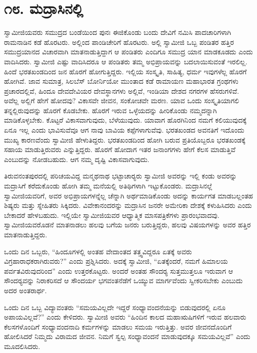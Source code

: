 
\chapter*{೧೮. ಮದ್ರಾಸಿನಲ್ಲಿ}

ಸ್ವಾಮೀಜಿಯವರು ಸಮುದ್ರದ ಬಂಡೆಯಿಂದ ಪುನಃ ಈಜಿಕೊಂಡು ಬಂದು ದೇವಿಗೆ ನಮಿಸಿ ಪಾದಚಾರಿಗಳಾಗಿ ರಾಮನಾಡಿನ ಕಡೆ ಹೊರಟರು. ಅಲ್ಲಿಂದ ಪಾಂಡಿಚೇರಿಗೆ ಹೊರಟರು. ಅಲ್ಲಿ ಸ್ವಾಮೀಜಿ ಒಬ್ಬ ಪಂಡಿತರ ಹತ್ತಿರ ಸಮುದ್ರಯಾನದ ವಿಚಾರವಾಗಿ ಮಾತನಾಡುತ್ತಿದ್ದಾಗ ಆ ಪಂಡಿತರು ಎಂದಿಗೂ ಸಮುದ್ರ ಯಾನ ಮಾಡಕೂಡದು ಎಂದು ವಾದಿಸಿದರು. ಸ್ವಾಮೀಜಿ ಎಷ್ಟು ವಾದಿಸಿದರೂ ಆ ಪಂಡಿತರು ತಮ್ಮ ಅಭಿಪ್ರಾಯವನ್ನು ಬದಲಾಯಿಸುವಂತೆ ಇರಲಿಲ್ಲ. ಹಿಂದೆ ಭರತಖಂಡದಿಂದ ಜನ ಹೊರಗೆ ಹೋಗುತ್ತಿದ್ದರು. ಇಲ್ಲಿಯ ಸಂಸ್ಕೃತಿ, ಸಾಹಿತ್ಯ, ಧರ್ಮ ಇವುಗಳೆಲ್ಲ ಹೊರಗೆ ಹೋಗಿವೆ. ಜಾವ ಸುಮಾತ್ರ, ಸಿಲಬೆಸ್ ಬೋರ್ನಿಯೋ ಮುಂತಾದ ಕಡೆ ರಾಮಾಯಣ ಮಹಾಭಾರತ ಗ್ರಂಥಗಳು ಪ್ರಚಾರದಲ್ಲಿವೆ, ಹಿಂದೂ ದೇವದೇವಿಯರ ದೇವಸ್ಥಾನಗಳು ಅಲ್ಲಿವೆ, ಇಂಡಿಯಾ ದೇಶದ ನಗರಗಳ ಹೆಸರುಗಳಿವೆ. ಅವೆಲ್ಲ ಅಲ್ಲಿಗೆ ಹೇಗೆ ಹೋದವು? ವಿಕಾಸವೇ ಜೀವನ, ಸಂಕೋಚವೇ ಮರಣ. ಯಾವ ಒಂದು ಸಂಸ್ಕೃತಿಯಾಗಲಿ ತನ್ನಲ್ಲಿರುವುದನ್ನು ಹೊರಗೆ ಕೊಡಬೇಕು. ಹೊರಗೆ ಇರುವ ಒಳ್ಳೆಯದನ್ನು ಹೀರಿಕೊಂಡು ನಮ್ಮದನ್ನಾಗಿ ಮಾಡಿಕೊಳ್ಳಬೇಕು. ಕೊಟ್ಟರೆ ವಿಕಾಸವಾಗುವುದು, ಬೆಳೆಯುವುದು. ಯಾವಾಗ ಹೊರಗಿನಿಂದ ನಮಗೆ ಕಲಿಯುವುದಕ್ಕೆ ಏನೂ ಇಲ್ಲ ಎಂದು ಭಾವಿಸುವೆವೂ ಆಗ ನಾವು ಬಾವಿಯ ಕಪ್ಪೆಗಳಾಗುವೆವು. ಭರತಖಂಡದ ಅವನತಿಗೆ ಇದೊಂದು ಮುಖ್ಯ ಕಾರಣವೆಂದು ಸ್ವಾಮೀಜಿ ಹೇಳುತಿದ್ದರು. ಭರತಖಂಡದಿಂದ ಹೋಗಿ ಬರುವ ಪ್ರತಿಯೊಬ್ಬರೂ ಭರತಖಂಡಕ್ಕೆ ಸಹಾಯ ಮಾಡುತ್ತಿರುವರು ಎನ್ನುತ್ತಿದ್ದರು. ಹೊರಗೆ ಹೋದಾಗ ಇತರ ಜನಾಂಗಗಳು ಹೇಗೆ ಕೆಲಸ ಮಾಡುತ್ತಿವೆ ಎಂಬುದನ್ನು ನೋಡಬಹುದು. ಆಗ ನಮ್ಮ ದೃಷ್ಟಿ ವಿಕಾಸವಾಗುವುದು. 

 ತಿರುವನಂತಪುರದಲ್ಲಿ ಪರಿಚಯವಿದ್ದ ಮನ್ಮಥನಾಥ ಭಟ್ಟಾಚಾರ‍್ಯರು ಸ್ವಾಮೀಜಿ ಅವರನ್ನು ಇಲ್ಲಿ ಕಂಡು ಅವರನ್ನು ಮದ್ರಾಸಿಗೆ ಕರೆದುಕೊಂಡು ಹೋಗಿ ತಮ್ಮ ಮನೆಯಲ್ಲಿ ಅತಿಥಿಗಳಾಗಿ ಇಟ್ಟುಕೊಂಡರು. ಮದ್ರಾಸಿನಲ್ಲೆ ಸ್ವಾಮೀಜಿಯವರಿಗೆ, ಅವರ ಅಭಿಪ್ರಾಯಗಳನ್ನೆಲ್ಲ ಚೆನ್ನಾಗಿ ಅರ್ಥಮಾಡಿಕೊಂಡು ಅದನ್ನು ಕಾರ್ಯಗತ ಮಾಡಬಲ್ಲಂತಹ ಶಿಷ್ಯರು ಮತ್ತು ಸ್ನೇಹಿತರು ಸಿಕ್ಕಿದರು. ವಿವೇಕಾನಂದರನ್ನು ಮದ್ರಾಸಿನ ಜನರೇ ಅಮೇರಿಕಾ ದೇಶಕ್ಕೆ ಕಳುಹಿಸಿದರು ಎಂದು ಬೇಕಾದರೆ ಹೇಳಬಹುದು. ಇಲ್ಲಿಯೇ ಸ್ವಾಮೀಜಿಯವರ ಆಧ್ಯಾತ್ಮಿಕ ಮಾಸಪತ್ರಿಕೆಗಳು ಪ್ರಾರಂಭವಾದವು. ಸ್ವಾಮೀಜಿಯವರೊಡನೆ ಮಾತನಾಡಲು ಹಲವು ಬಗೆಯ ಜನರು ಬರುತ್ತಿದ್ದರು, ಹಲವು ವಿಷಯಗಳನ್ನು ಅವರ ಹತ್ತಿರ ಮಾತನಾಡುತ್ತಿದ್ದರು. 

 ಒಂದು ದಿನ ಒಬ್ಬರು, “ಹಿಂದೂಗಳಲ್ಲಿ ಅಂತಹ ವೇದಾಂತದ ತತ್ತ್ವವಿದ್ದರೂ ಏತಕ್ಕೆ ಅವರು ವಿಗ್ರಹಾರಾಧಕರಾಗಿರುವರು?” ಎಂದು ಪ್ರಶ್ನಿಸಿದರು. ಅದಕ್ಕೆ ಸ್ವಾಮೀಜಿ, “ಏತಕ್ಕೆಂದರೆ, ನಮಗೆ ಹಿಮಾಲಯ ಪರ್ವತವಿರುವುದರಿಂದ” ಎಂದು ಉತ್ತರಕೊಟ್ಟರು. ಅಂದರೆ ಅಂತಹ ಸೌಂದರ‍್ಯ ಸುತ್ತಮುತ್ತಲೂ ಇರುವಾಗ ಆ ಸೌಂದರ‍್ಯವನ್ನು ನಿರಾಕರಿಸದೆ ಆ ಸೌಂದರ್ಯ ಭಗವಂತನೆಡೆಗೆ ಒಯ್ಯುವ ಮಾರ್ಗವೆಂದು ಸ್ವೀಕರಿಸಬೇಕು ಎಂಬುದು ಅದರ ಅಂತರಾರ್ಥ. 

 ಒಂದು ದಿನ ಒಬ್ಬ ವಿದ್ಯಾವಂತರು “ಸಮಯವಿಲ್ಲದೇ ಇದ್ದರೆ ಸಂಧ್ಯಾವಂದನೆಯನ್ನು ಬಿಡುವುದರಲ್ಲಿ ಏನೂ ಅಪಾಯವಿಲ್ಲವೆ?” ಎಂದು ಕೇಳಿದರು. ಸ್ವಾಮೀಜಿ ಅವರು “ಹಿಂದಿನ ಕಾಲದ ಮಹಾಋಷಿಗಳಿಗೆ ಇರುವ ಹಲವಾರು ಕೆಲಸಗಳೊಂದಿಗೆ ಸಂಧ್ಯಾವಂದನಾದಿ ಕರ್ಮಗಳನ್ನು ಮಾಡಲು ಸಮಯ ಇರುತ್ತಿತ್ತು. ಅವರ ಜೀವನದೊಂದಿಗೆ ಹೋಲಿಸಿದರೆ ನಿಮ್ಮದು ವಿರಾಮದ ಜೀವನ. ನಿಮಗೆ ಸ್ವಲ್ಪ ಸಂಧ್ಯಾವಂದನೆ ಮಾಡುವುದಕ್ಕೂ ಸಮಯವಿಲ್ಲವೆ” ಎಂದು ಮೂದಲಿಸಿದರು. 

